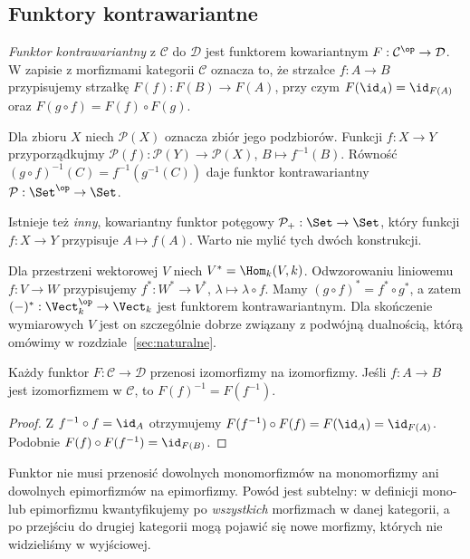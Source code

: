 \subsection{Funktory kontrawariantne}

\begin{definicja}
\emph{Funktor kontrawariantny} z $\mathcal C$ do $\mathcal D$ jest funktorem kowariantnym $F:\mathcal C^{\op}\to\mathcal D$. W zapisie z morfizmami kategorii $\mathcal C$ oznacza to, że strzałce $f:A\to B$ przypisujemy strzałkę $F(f):F(B)\to F(A)$, przy czym $F(\id_A)=\id_{F(A)}$ oraz $F(g\circ f)=F(f)\circ F(g)$.
\end{definicja}

\begin{przyklad}[Przeciwobraz]
Dla zbioru $X$ niech $\mathcal P(X)$ oznacza zbiór jego podzbiorów. Funkcji $f:X\to Y$ przyporządkujmy $\mathcal P(f):\mathcal P(Y)\to\mathcal P(X)$, $B\mapsto f^{-1}(B)$. Równość $(g\circ f)^{-1}(C)=f^{-1}(g^{-1}(C))$ daje funktor kontrawariantny $\mathcal P:\Set^{\op}\to\Set$.

Istnieje też \emph{inny}, kowariantny funktor potęgowy $\mathcal P_+:\Set\to\Set$, który funkcji $f:X\to Y$ przypisuje $A\mapsto f(A)$. Warto nie mylić tych dwóch konstrukcji.
\end{przyklad}

\begin{przyklad}\label{przyklad:dualny}
Dla przestrzeni wektorowej $V$ niech $V^*=\Hom_k(V,k)$. Odwzorowaniu liniowemu $f:V\to W$ przypisujemy $f^*:W^*\to V^*$, $\lambda\mapsto\lambda\circ f$. Mamy $(g\circ f)^*=f^*\circ g^*$, a zatem $(-)^*:\Vect_k^{\op}\to\Vect_k$ jest funktorem kontrawariantnym. Dla skończenie wymiarowych $V$ jest on szczególnie dobrze związany z podwójną dualnością, którą omówimy w rozdziale~\ref{sec:naturalne}.
\end{przyklad}

\begin{stwierdzenie}\label{tw:funktory-iso}
Każdy funktor $F:\mathcal C\to\mathcal D$ przenosi izomorfizmy na izomorfizmy. Jeśli $f:A\to B$ jest izomorfizmem w $\mathcal C$, to $F(f)^{-1}=F(f^{-1})$.
\end{stwierdzenie}
\begin{proof}
Z $f^{-1}\circ f=\id_A$ otrzymujemy $F(f^{-1})\circ F(f)=F(\id_A)=\id_{F(A)}$. Podobnie $F(f)\circ F(f^{-1})=\id_{F(B)}$.
\end{proof}

\begin{uwaga}
Funktor nie musi przenosić dowolnych monomorfizmów na monomorfizmy ani dowolnych epimorfizmów na epimorfizmy. Powód jest subtelny: w definicji mono- lub epimorfizmu kwantyfikujemy po \emph{wszystkich} morfizmach w danej kategorii, a po przejściu do drugiej kategorii mogą pojawić się nowe morfizmy, których nie widzieliśmy w wyjściowej.
\end{uwaga}

